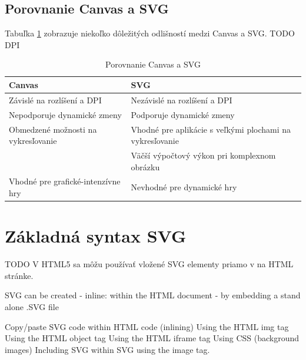  
 \subsection{Porovnanie Canvas a SVG}
 Tabuľka \ref{canvas:SVG} zobrazuje niekoľko dôležitých odlišností medzi Canvas a SVG. 
 TODO DPI
 \begin{table}[h]
 \centering
 \begin{tabular}{|l|p{7.5cm} |}
 	\hline \textbf{Canvas} & \textbf{SVG} \\
 	 	\hline Závislé na rozlíšení a \acs{DPI} & Nezávislé na rozlíšení a DPI \\ 
 	\hline Nepodporuje dynamické zmeny & Podporuje dynamické zmeny \\ 
 	\hline Obmedzené možnosti na vykresľovanie  & Vhodné pre aplikácie s veľkými plochami na vykresľovanie \\ 
 	\hline & Väčší výpočtový výkon pri komplexnom obrázku \\ 
 	\hline Vhodné pre grafické-intenzívne hry & Nevhodné pre dynamické hry \\ 
 	\hline 
 \end{tabular} 

 \caption{Porovnanie Canvas a SVG}
 \label{canvas:SVG}
 
\end{table}
 
 
 \section{Základná syntax \acs*{SVG}}
TODO
V HTML5 sa môžu používať vložené SVG elementy priamo v na HTML stránke. 


SVG can be created 
-   inline: within the HTML document 
-   by embedding a stand alone .SVG file


Copy/paste SVG code within HTML code (inlining)
Using the HTML img tag
Using the HTML object tag
Using the HTML iframe tag
Using CSS (background images)
Including SVG within SVG using the image tag.




